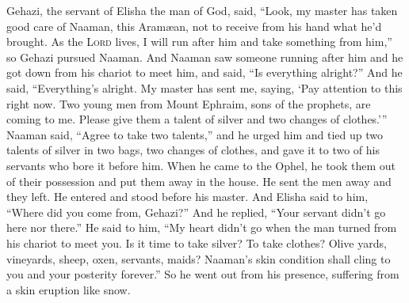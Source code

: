 \begin{inparaenum}
     Gehazi, the servant of Elisha the man of God, said, ``Look, my master has taken good care of Naaman, this Aram\ae{}an, not to receive from his hand what he'd brought. As the \textsc{Lord} lives, I will run after him and take something from him,''%
     so Gehazi pursued Naaman. And Naaman saw someone running after him and he got down from his chariot to meet him, and said, ``Is everything alright?''%
     And he said, ``Everything's alright. My master has sent me, saying, `Pay attention to this right now. Two young men from Mount Ephraim, sons of the prophets, are coming to me. Please give them a talent of silver and two changes of clothes.'\thinspace''%
     Naaman said, ``Agree to take two talents,'' and he urged him and tied up two talents of silver in two bags, two changes of clothes, and gave it to two of his servants who bore it before him.%
     When he came to the Ophel, he took them out of their possession and put them away in the house. He sent the men away and they left.%
     He entered and stood before his master. And Elisha said to him, ``Where did you come from, Gehazi?'' And he replied, ``Your servant didn't go here nor there.''%
     He said to him, ``My heart didn't go when the man turned from his chariot to meet you.  Is it time to take silver? To take clothes? Olive yards, vineyards, sheep, oxen, servants, maids?%
     Naaman's skin condition shall cling to you and your posterity forever.'' So he went out from his presence, suffering from a skin eruption like snow.%
\end{inparaenum}
